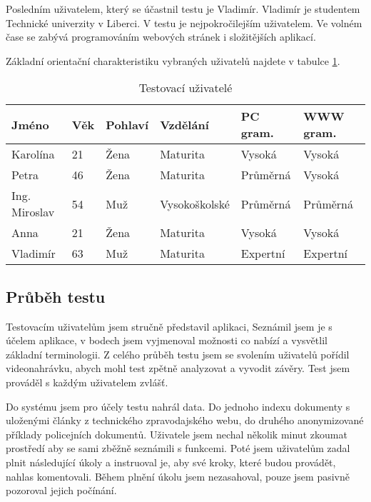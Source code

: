Posledním uživatelem, který se účastnil testu je Vladimír. Vladimír je studentem Technické univerzity v Liberci. V testu je nejpokročilejším uživatelem. Ve volném čase se zabývá programováním webových stránek i složitějších aplikací.

Základní orientační charakteristiku vybraných uživatelů najdete v tabulce \ref{tab:test_usrs}.

\begin{table}
\begin{center}
\begin{tabular}{|l|l|l|l|l|l|}
\hline
\textbf{Jméno} & \textbf{Věk} & \textbf{Pohlaví} & \textbf{Vzdělání} & \textbf{PC gram.} & \textbf{WWW gram.} \\ \hline
Karolína & 21 & Žena & Maturita & Vysoká & Vysoká \\ \hline
Petra & 46 & Žena & Maturita & Průměrná & Vysoká \\ \hline
Ing. Miroslav & 54 & Muž & Vysokoškolské & Průměrná & Průměrná \\ \hline
Anna & 21 & Žena & Maturita & Vysoká & Vysoká \\ \hline
Vladimír & 63 & Muž & Maturita & Expertní & Expertní \\ \hline
\end{tabular}
\end{center}
\caption{Testovací uživatelé}
\label{tab:test_usrs}
\end{table}

\subsection{Průběh testu}
Testovacím uživatelům jsem stručně představil aplikaci, Seznámil jsem je s účelem aplikace, v bodech jsem vyjmenoval možnosti co nabízí a vysvětlil základní terminologii. Z celého průběh testu jsem se svolením uživatelů pořídil videonahrávku, abych mohl test zpětně analyzovat a vyvodit závěry. Test jsem prováděl s každým uživatelem zvlášť.

Do systému jsem pro účely testu nahrál data. Do jednoho indexu dokumenty s uloženými články z technického zpravodajského webu, do druhého anonymizované příklady policejních dokumentů. Uživatele jsem nechal několik minut zkoumat prostředí aby se sami zběžně seznámili s funkcemi. Poté jsem uživatelům zadal plnit následující úkoly a instruoval je, aby své kroky, které budou provádět, nahlas komentovali. Během plnění úkolu jsem nezasahoval, pouze jsem pasivně pozoroval jejich počínání.

